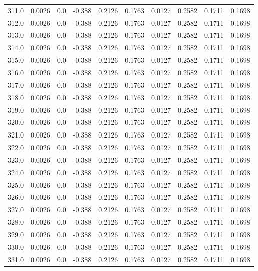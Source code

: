 \begin{longtable}{lrrrrrrrrr}
311.0 & 0.0026 & 0.0 & -0.388 & 0.2126 & 0.1763 & 0.0127 & 0.2582 & 0.1711 & 0.1698 \\
312.0 & 0.0026 & 0.0 & -0.388 & 0.2126 & 0.1763 & 0.0127 & 0.2582 & 0.1711 & 0.1698 \\
313.0 & 0.0026 & 0.0 & -0.388 & 0.2126 & 0.1763 & 0.0127 & 0.2582 & 0.1711 & 0.1698 \\
314.0 & 0.0026 & 0.0 & -0.388 & 0.2126 & 0.1763 & 0.0127 & 0.2582 & 0.1711 & 0.1698 \\
315.0 & 0.0026 & 0.0 & -0.388 & 0.2126 & 0.1763 & 0.0127 & 0.2582 & 0.1711 & 0.1698 \\
316.0 & 0.0026 & 0.0 & -0.388 & 0.2126 & 0.1763 & 0.0127 & 0.2582 & 0.1711 & 0.1698 \\
317.0 & 0.0026 & 0.0 & -0.388 & 0.2126 & 0.1763 & 0.0127 & 0.2582 & 0.1711 & 0.1698 \\
318.0 & 0.0026 & 0.0 & -0.388 & 0.2126 & 0.1763 & 0.0127 & 0.2582 & 0.1711 & 0.1698 \\
319.0 & 0.0026 & 0.0 & -0.388 & 0.2126 & 0.1763 & 0.0127 & 0.2582 & 0.1711 & 0.1698 \\
320.0 & 0.0026 & 0.0 & -0.388 & 0.2126 & 0.1763 & 0.0127 & 0.2582 & 0.1711 & 0.1698 \\
321.0 & 0.0026 & 0.0 & -0.388 & 0.2126 & 0.1763 & 0.0127 & 0.2582 & 0.1711 & 0.1698 \\
322.0 & 0.0026 & 0.0 & -0.388 & 0.2126 & 0.1763 & 0.0127 & 0.2582 & 0.1711 & 0.1698 \\
323.0 & 0.0026 & 0.0 & -0.388 & 0.2126 & 0.1763 & 0.0127 & 0.2582 & 0.1711 & 0.1698 \\
324.0 & 0.0026 & 0.0 & -0.388 & 0.2126 & 0.1763 & 0.0127 & 0.2582 & 0.1711 & 0.1698 \\
325.0 & 0.0026 & 0.0 & -0.388 & 0.2126 & 0.1763 & 0.0127 & 0.2582 & 0.1711 & 0.1698 \\
326.0 & 0.0026 & 0.0 & -0.388 & 0.2126 & 0.1763 & 0.0127 & 0.2582 & 0.1711 & 0.1698 \\
327.0 & 0.0026 & 0.0 & -0.388 & 0.2126 & 0.1763 & 0.0127 & 0.2582 & 0.1711 & 0.1698 \\
328.0 & 0.0026 & 0.0 & -0.388 & 0.2126 & 0.1763 & 0.0127 & 0.2582 & 0.1711 & 0.1698 \\
329.0 & 0.0026 & 0.0 & -0.388 & 0.2126 & 0.1763 & 0.0127 & 0.2582 & 0.1711 & 0.1698 \\
330.0 & 0.0026 & 0.0 & -0.388 & 0.2126 & 0.1763 & 0.0127 & 0.2582 & 0.1711 & 0.1698 \\
331.0 & 0.0026 & 0.0 & -0.388 & 0.2126 & 0.1763 & 0.0127 & 0.2582 & 0.1711 & 0.1698 \\

\end{longtable}
